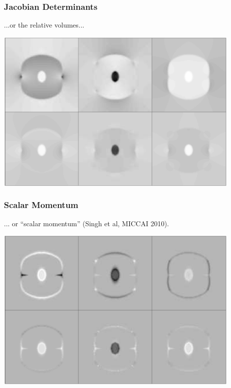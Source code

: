 \documentclass{beamer}
\begin{document}
\begin{frame}
\frametitle{Jacobian Determinants}
...or the relative volumes...
\begin{center}
\includegraphics[width=0.9\textwidth]{jacobians}
\end{center}
\end{frame}

\begin{frame}
\frametitle{Scalar Momentum}
... or ``scalar momentum'' (Singh et al, MICCAI 2010).
\begin{center}
\includegraphics[width=0.9\textwidth]{alpha}
\end{center}
\end{frame}
\end{document}
